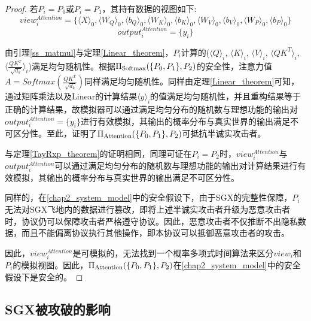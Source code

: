 \begin{proof}
	若$P_i=P_0$或$P_i=P_1$，其持有数据的视图如下:
	$$view_i^{Attention}=\{\langle X\rangle_0, \langle W_Q\rangle_0, \langle b_Q\rangle_0, \langle W_K\rangle_0, \langle b_K\rangle_0, \langle W_V\rangle_0, \langle b_V\rangle_0, \langle W_P\rangle_0, \langle b_P\rangle_0\}$$
	$$output_i^{Attention}=\{y_i\}$$
	
	由引理\ref{ss_matmul}与定理\ref{Linear_theorem}，$P_i$计算的($\langle Q\rangle_i$, $\langle K\rangle_i$, $\langle V\rangle_i$, $\langle QK^T\rangle_i$, $\langle\frac{ QK^T }{\sqrt[]{d_k}}\rangle_i$)满足均匀随机性。根据$\Pi_{\rm Softmax}(\{P_0, P_1\}, P_2)$的安全性，注意力值$A=Softmax(\frac{ QK^T }{\sqrt[]{d_k}})$同样满足均匀随机性。同样由定理\ref{Linear_theorem}可知，通过矩阵乘法以及Linear的计算结果$\langle y\rangle_i$的值满足均匀随机性，并且重构结果等于正确的计算结果，故模拟器可以通过满足均匀分布的随机数与理想功能的输出对$output_i^{Attention}=\{y_i\}$进行有效模拟，其输出的概率分布与真实世界的输出满足不可区分性。至此，证明了$\Pi_{\rm Attention}(\{P_0, P_1\}, P_2)$可抵抗半诚实攻击者。
	
	与定理\ref{TayRxp_theorem}的证明相同，同理可证在$P_i=P_2$时，$view_i^{Attention}$与$output_i^{Attention}$可以通过满足均匀分布的随机数与理想功能的输出对计算结果进行有效模拟，其输出的概率分布与真实世界的输出满足不可区分性。
	
	同样的，在\ref{chap2_system_model}中的安全假设下，由于SGX的完整性保障\cite{SGX_Explained}，$P_i$无法对SGX飞地内的数据进行篡改，即将上述半诚实攻击者升级为恶意攻击者时，协议仍可以保障攻击者严格遵守协议。因此，恶意攻击者不仅推断不出隐私数据，而且不能偏离协议执行其他操作，即本协议可以抵御恶意攻击者的攻击。
	
	因此，$view_i^{Attention}$是可模拟的，无法找到一个概率多项式时间算法来区分$view_i$和$P_i$的模拟视图。因此，$\Pi_{\rm Attention}(\{P_0, P_1\}, P_2)$在\ref{chap2_system_model}中的安全假设下是安全的。
	
\end{proof}





\subsection{SGX被攻破的影响}

